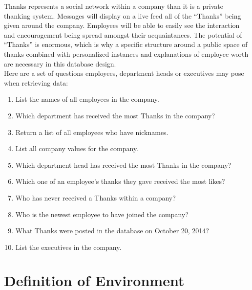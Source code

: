\documentclass[11pt]{report}
\begin{document}
Thanks represents a social network within a company than it is a private thanking system. Messages will display on a live feed all of the “Thanks” being given around the company. Employees will be able to easily see the interaction and encouragement being spread amongst their acquaintances. The potential of “Thanks” is enormous, which is why a specific structure around a public space of thanks combined with personalized instances and explanations of employee worth are necessary in this database design.\\

\clearpage
Here are a set of questions employees, department heads or executives may pose when retrieving data:
\begin{enumerate}
    \item List the names of all employees in the company.
    \item Which department has received the most Thanks in the company?
    \item Return a list of all employees who have nicknames.
    \item List all company values for the company.
    \item Which department head has received the most Thanks in the company?
    \item Which one of an employee's thanks they gave received the most likes?
    \item Who has never received a Thanks within a company?
    \item Who is the newest employee to have joined the company?
    \item What Thanks were posted in the database on October 20, 2014?
    \item List the executives in the company.
\end{enumerate}

\chapter{Definition of Environment}
\end{document}
